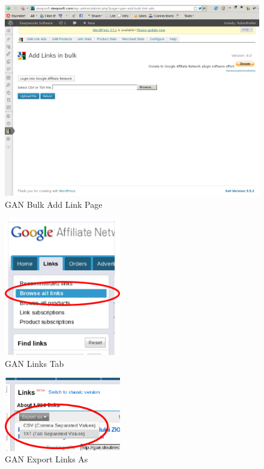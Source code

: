 \documentclass[letterpaper]{article}
\begin{document}
\begin{figure}[ht]
\begin{centering}
\includegraphics[width=4.5in]{ganaddlinkbulk.png}
\caption{GAN Bulk Add Link Page}
\label{fig:ganaddlinkbulk}
\end{centering}
\end{figure}
\begin{figure}[ht]
\begin{centering}
\includegraphics[width=2in]{ganLinksTab.png}
\caption{GAN Links Tab}
\label{fig:ganLinksTab}
\end{centering}
\end{figure}
\begin{figure}[ht]
\begin{centering}
\includegraphics[width=2in]{ganExport.png}
\caption{GAN Export Links As}
\label{fig:ganExport}
\end{centering}
\end{figure}
\end{document}
